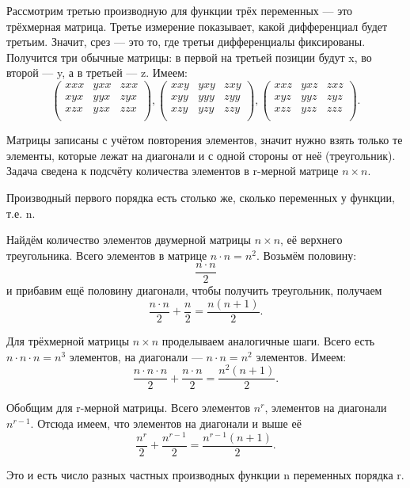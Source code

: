 \documentclass{book}
\begin{document}
Рассмотрим третью производную для функции трёх переменных --- это трёхмерная матрица.
Третье измерение показывает, какой дифференциал будет третьим.
Значит, срез --- это то, где третьи дифференциалы фиксированы.
Получится три обычные матрицы: в первой на третьей позиции будут x, во второй --- y, а в третьей --- z.
Имеем: 
$$
\begin{pmatrix}
xxx & yxx & zxx \\ 
xyx & yyx & zyx \\
xzx & yzx & zzx \\
\end{pmatrix}
,
\begin{pmatrix}
xxy & yxy & zxy \\
xyy & yyy & zyy \\
xzy & yzy & zzy \\
\end{pmatrix}
,
\begin{pmatrix}
xxz & yxz & zxz \\
xyz & yyz & zyz \\
xzz & yzz & zzz \\
\end{pmatrix}
.$$

Матрицы записаны с учётом повторения элементов, значит нужно взять только те элементы, которые лежат на диагонали и с одной стороны от неё (треугольник).
Задача сведена к подсчёту количества элементов в r-мерной матрице $n\times n$.

Производный первого порядка есть столько же, сколько переменных у функции, т.е. n.

Найдём количество элементов двумерной матрицы $n\times n$, её верхнего треугольника.
Всего элементов в матрице $n\cdot n=n^2$.
Возьмём половину: $$\frac{n\cdot n}{2}$$ и прибавим ещё половину диагонали, чтобы получить треугольник, получаем
$$ \frac{n \cdot n}{2} + \frac{n}{2} = \frac{n(n+1)}{2}.$$

Для трёхмерной матрицы $n\times n$ проделываем аналогичные шаги.
Всего есть $n \cdot n \cdot n = n^3$ элементов, на диагонали --- $n \cdot n = n^2$ элементов.
Имеем: $$ \frac{n \cdot n \cdot n}{2} + \frac{n \cdot n}{2} = \frac{n^2(n+1)}{2}.$$

Обобщим для r-мерной матрицы.
Всего элементов $n^r$, элементов на диагонали $n^{r-1}$.
Отсюда имеем, что элементов на диагонали и выше её
$$ \frac{n^r}{2} + \frac{n^{r-1}}{2} = \frac{n^{r-1}(n+1)}{2}.$$

Это и есть число разных частных производных функции n переменных порядка r.
\end{document}
